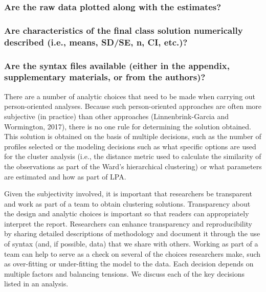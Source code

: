 \documentclass[man]{apa6}
\begin{document}
\hypertarget{are-the-raw-data-plotted-along-with-the-estimates}{%
\subsubsection{Are the raw data plotted along with the estimates?}\label{are-the-raw-data-plotted-along-with-the-estimates}}

\hypertarget{are-characteristics-of-the-final-class-solution-numerically-described-i.e.-means-sdse-n-ci-etc.}{%
\subsubsection{Are characteristics of the final class solution numerically described (i.e., means, SD/SE, n, CI, etc.)?}\label{are-characteristics-of-the-final-class-solution-numerically-described-i.e.-means-sdse-n-ci-etc.}}

\hypertarget{are-the-syntax-files-available-either-in-the-appendix-supplementary-materials-or-from-the-authors}{%
\subsubsection{Are the syntax files available (either in the appendix, supplementary materials, or from the authors)?}\label{are-the-syntax-files-available-either-in-the-appendix-supplementary-materials-or-from-the-authors}}

There are a number of analytic choices that need to be made when carrying out
person-oriented analyses. Because such person-oriented approaches are often more
subjective (in practice) than other approaches (Linnenbrink-Garcia and
Wormington, 2017), there is no one rule for determining the solution obtained.
This solution is obtained on the basis of multiple decisions, such as the number
of profiles selected or the modeling decisions such as what specific options are
used for the cluster analysis (i.e., the distance metric used to calculate the
similarity of the observations as part of the Ward's hierarchical clustering) or
what parameters are estimated and how as part of LPA.

Given the subjectivity involved, it is important that researchers be transparent
and work as part of a team to obtain clustering solutions. Transparency about
the design and analytic choices is important so that readers can appropriately
interpret the report. Researchers can enhance transparency and reproducibility
by sharing detailed descriptions of methodology and document it through the use
of syntax (and, if possible, data) that we share with others. Working as part of
a team can help to serve as a check on several of the choices researchers make,
such as over-fitting or under-fitting the model to the data. Each decision
depends on multiple factors and balancing tensions. We discuss each of the key
decisions listed in an analysis.
\end{document}
